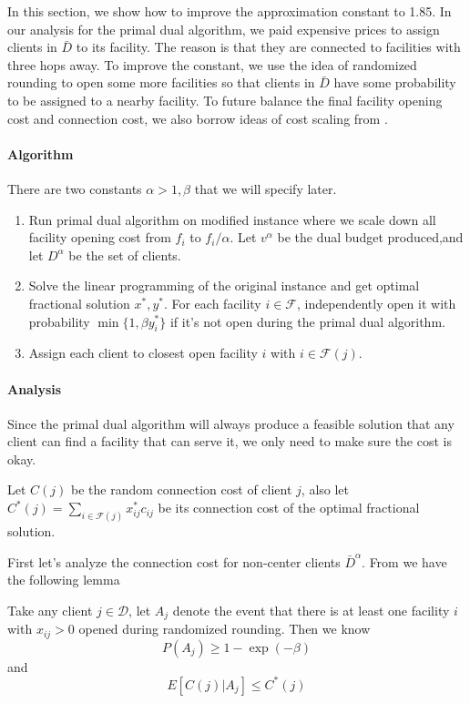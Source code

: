 In this section, we show how to improve the approximation constant to 1.85.
In our analysis for the primal dual algorithm, we paid expensive prices to
assign clients in $\bar D$ to its facility.
The reason is that they are connected to facilities with three hops away.
To improve the constant, we use the idea of randomized rounding\cite{chudak2003improved}
to open some more facilities so that clients in $\bar D$ have some probability
to be assigned to a nearby facility.
To future balance the final facility opening cost and connection cost,
we also borrow ideas of cost scaling from \cite{charikar2005improved}.

\paragraph{Algorithm}
There are two constants $\alpha > 1, \beta$ that we will specify later.

\begin{enumerate}
\item Run primal dual algorithm on modified instance
where we scale down all facility opening cost from $f_i$ to $f_i/\alpha$.
Let $v^\alpha$ be the dual budget produced,and let $D^\alpha$ be the set of  clients.
\item Solve the linear programming of the original instance and get optimal fractional solution $x^*, y^*$.
For each facility $i \in \mathcal{F}$, independently open it with probability $\min\{1, \beta y^*_i\}$
if it's not open during the primal dual algorithm.
\item Assign each client to closest open facility $i$ with $i \in \mathcal{F}(j)$.
\end{enumerate}


\paragraph{Analysis}
Since the primal dual algorithm will always produce a feasible solution
that any client can find a facility that can serve it,
we only need to make sure the cost is okay.

Let $C(j)$ be the random connection cost of client $j$,
also let $C^*(j) = \sum_{i \in \mathcal{F}(j)} x_{ij}^* c_{ij}$ be its connection cost of the optimal fractional solution.

First let's analyze the connection cost for non-center clients $\bar D^\alpha$.
From \cite{chudak2003improved} we have the following lemma

\begin{lem}
Take any client $j \in \mathcal{D}$,
let $A_j$ denote the event that there is at least one facility $i$ with $x_{ij} > 0$ opened during randomized rounding.
Then we know
\[  P(A_j) \ge 1 - \exp(-\beta) \]
and
\[  E[C(j) | A_j] \le C^*(j)    \]
\end{lem}

